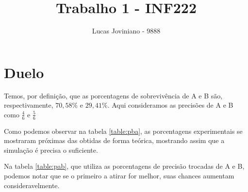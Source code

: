 \documentclass{report}
\title{\Huge{Trabalho 1 - INF222}}
\author{\huge{Lucas Joviniano - 9888}}
\begin{document}
\maketitle
\newpage%
\newpage
\section{Duelo}

Temos, por definição, que as porcentagens de sobrevivência de A e B
são, respectivamente, $70,58\%$ e $29,41\%$. Aqui consideramos as precisões
de A e B como $\frac{4}{6}$ e $\frac{5}{6}$

Como podemos observar na tabela \ref*{table:pba}, as porcentagens 
experimentais se mostraram próximas das obtidas de forma teórica, mostrando
assim que a simulação é precisa o suficiente. 

Na tabela \ref{table:pab}, que utiliza as porcentagens de precisão trocadas
de A e B, podemos notar que se o primeiro a atirar for melhor, suas chances
aumentam consideravelmente. 

\begin{table}[h]
    \caption{Porcentagem de Sobrevivência de A e B com B melhor}
    \label{table:pba}
    \centering
\end{table}

\begin{table}[h]
    \caption{Porcentagem de Sobrevivência de A e B com A melhor}
    \label{table:pab}
    \centering
\end{table}
\newpage
\end{document}
